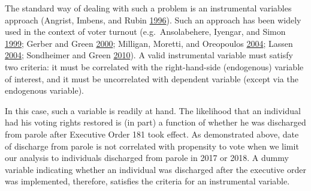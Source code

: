 \documentclass[
  12pt,
]{article}
\begin{document}
The standard way of dealing with such a problem is an instrumental variables approach (Angrist, Imbens, and Rubin \protect\hyperlink{ref-Angrist1996}{1996}). Such an approach has been widely used in the context of voter turnout (e.g.~Ansolabehere, Iyengar, and Simon \protect\hyperlink{ref-Ansolabehere1999}{1999}; Gerber and Green \protect\hyperlink{ref-Gerber2000}{2000}; Milligan, Moretti, and Oreopoulos \protect\hyperlink{ref-Milligan2004}{2004}; Lassen \protect\hyperlink{ref-Lassen2004}{2004}; Sondheimer and Green \protect\hyperlink{ref-Sondheimer2010}{2010}). A valid instrumental variable must satisfy two criteria: it must be correlated with the right-hand-side (endogenous) variable of interest, and it must be uncorrelated with dependent variable (except via the endogenous variable).

In this case, such a variable is readily at hand. The likelihood that an individual had his voting rights restored is (in part) a function of whether he was discharged from parole after Executive Order 181 took effect. As demonstrated above, date of discharge from parole is not correlated with propensity to vote when we limit our analysis to individuals discharged from parole in 2017 or 2018. A dummy variable indicating whether an individual was discharged after the executive order was implemented, therefore, satisfies the criteria for an instrumental variable.
\end{document}
